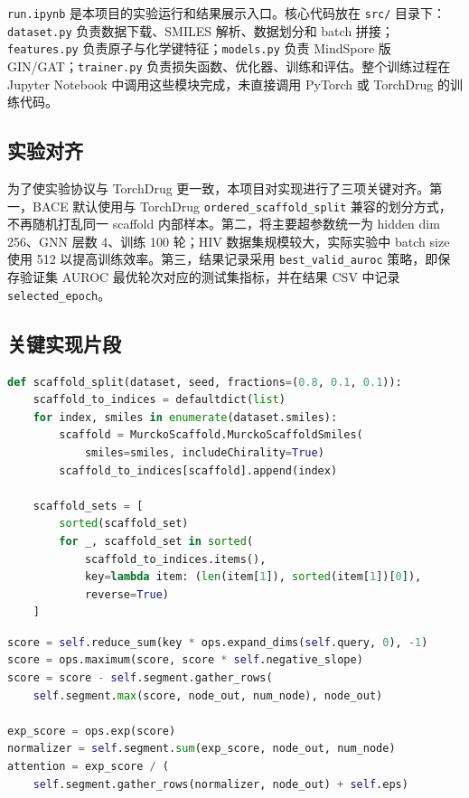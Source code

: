\documentclass[12pt,hyperref,a4paper,UTF8]{ctexart}
\begin{document}
\texttt{run.ipynb} 是本项目的实验运行和结果展示入口。核心代码放在 \texttt{src/} 目录下：\texttt{dataset.py} 负责数据下载、SMILES 解析、数据划分和 batch 拼接；\texttt{features.py} 负责原子与化学键特征；\texttt{models.py} 负责 MindSpore 版 GIN/GAT；\texttt{trainer.py} 负责损失函数、优化器、训练和评估。整个训练过程在 Jupyter Notebook 中调用这些模块完成，未直接调用 PyTorch 或 TorchDrug 的训练代码。

\subsection{实验对齐}

为了使实验协议与 TorchDrug 更一致，本项目对实现进行了三项关键对齐。第一，BACE 默认使用与 TorchDrug \texttt{ordered\_scaffold\_split} 兼容的划分方式，不再随机打乱同一 scaffold 内部样本。第二，将主要超参数统一为 hidden dim 256、GNN 层数 4、训练 100 轮；HIV 数据集规模较大，实际实验中 batch size 使用 512 以提高训练效率。第三，结果记录采用 \texttt{best\_valid\_auroc} 策略，即保存验证集 AUROC 最优轮次对应的测试集指标，并在结果 CSV 中记录 \texttt{selected\_epoch}。

\subsection{关键实现片段}

\begin{lstlisting}[language=Python, caption={TorchDrug ordered scaffold split 对齐实现片段}]
def scaffold_split(dataset, seed, fractions=(0.8, 0.1, 0.1)):
    scaffold_to_indices = defaultdict(list)
    for index, smiles in enumerate(dataset.smiles):
        scaffold = MurckoScaffold.MurckoScaffoldSmiles(
            smiles=smiles, includeChirality=True)
        scaffold_to_indices[scaffold].append(index)

    scaffold_sets = [
        sorted(scaffold_set)
        for _, scaffold_set in sorted(
            scaffold_to_indices.items(),
            key=lambda item: (len(item[1]), sorted(item[1])[0]),
            reverse=True)
    ]
\end{lstlisting}

\begin{lstlisting}[language=Python, caption={MindSpore GAT attention 稳定化实现片段}]
score = self.reduce_sum(key * ops.expand_dims(self.query, 0), -1)
score = ops.maximum(score, score * self.negative_slope)
score = score - self.segment.gather_rows(
    self.segment.max(score, node_out, num_node), node_out)

exp_score = ops.exp(score)
normalizer = self.segment.sum(exp_score, node_out, num_node)
attention = exp_score / (
    self.segment.gather_rows(normalizer, node_out) + self.eps)
\end{lstlisting}
\end{document}
